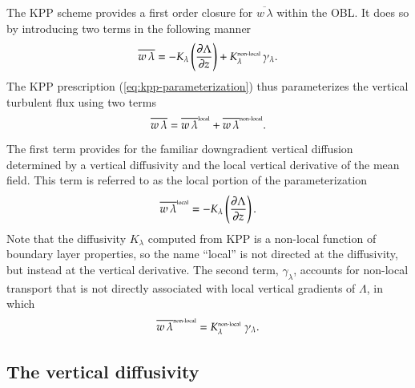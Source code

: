 The KPP scheme provides a first order closure for $\overline{w \,
  \lambda}$ within the OBL. It does so by introducing two terms in the
following manner 
\begin{equation}
  \overline{w \, \lambda} = -K_{\lambda} \left( \frac{\partial \Lambda}{\partial z}  \right)
   +  K^{\mbox{\tiny non-local}}_{\lambda}  \, \gamma_{\lambda}.
\label{eq:kpp-parameterization}
\end{equation}
The KPP prescription (\ref{eq:kpp-parameterization}) thus
parameterizes the vertical turbulent flux using two terms
\begin{equation}
  \overline{w \, \lambda} = \overline{w \, \lambda}^{\mbox{\tiny local}} + \overline{w \, \lambda}^{\mbox{\tiny non-local}}.
\label{eq:vertical-flux-decomposed}
\end{equation}
The first term provides for the familiar downgradient vertical
diffusion determined by a vertical diffusivity and the local vertical
derivative of the mean field.  This term is referred to as the local
portion of the parameterization
\begin{equation}
\overline{w \, \lambda}^{\mbox{\tiny local}} = -K_{\lambda}  \left( \frac{\partial \Lambda}{\partial z} \right).
\label{eq:vertical-flux-local}
\end{equation}
Note that the diffusivity $K_{\lambda} $ computed from KPP is a
non-local function of boundary layer properties, so the name ``local''
is not directed at the diffusivity, but instead at the vertical
derivative.  The second term, $\gamma_{\lambda}$, accounts for
non-local transport that is not directly associated with local
vertical gradients of $\Lambda$, in which
\begin{equation}
  \overline{w \, \lambda}^{\mbox{\tiny non-local}} = K^{\mbox{\tiny non-local}}_{\lambda} \; \gamma_{\lambda}.
\label{eq:vertical-flux-nonlocal}
\end{equation}


\subsection{The vertical diffusivity}
\label{subsection:kpp-vertical-diffusivity}

